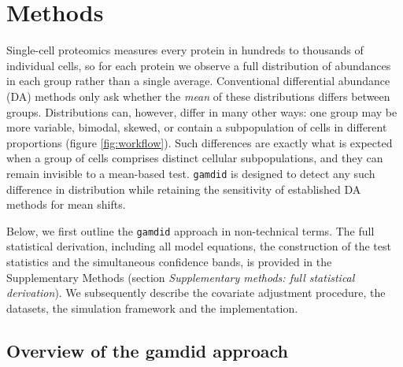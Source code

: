 \section{Methods} \label{methods}

Single-cell proteomics measures every protein in hundreds to thousands of individual cells, so for each protein we observe a full distribution of abundances in each group rather than a single average. Conventional differential abundance (DA) methods only ask whether the \emph{mean} of these distributions differs between groups. Distributions can, however, differ in many other ways: one group may be more variable, bimodal, skewed, or contain a subpopulation of cells in different proportions (figure \ref{fig:workflow}). Such differences are exactly what is expected when a group of cells comprises distinct cellular subpopulations, and they can remain invisible to a mean-based test. \texttt{gamdid} is designed to detect any such difference in distribution while retaining the sensitivity of established DA methods for mean shifts.

Below, we first outline the \texttt{gamdid} approach in non-technical terms. The full statistical derivation, including all model equations, the construction of the test statistics and the simultaneous confidence bands, is provided in the Supplementary Methods (section \textit{Supplementary methods: full statistical derivation}). We subsequently describe the covariate adjustment procedure, the datasets, the simulation framework and the implementation.

\subsection{Overview of the gamdid approach}

